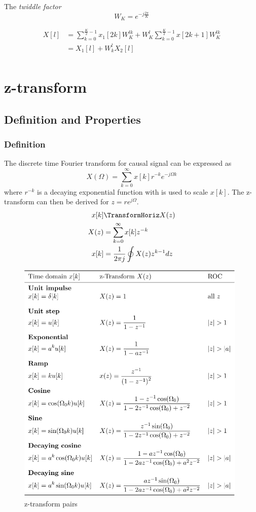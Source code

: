 The \textit{twiddle factor}
\begin{equation*}
    W_K = e^{-j\frac{2\pi}{K}}
\end{equation*}

\begin{align*}
    X[l] &= \sum_{k=0}^{\frac{K}{2}-1}x_1[2k]W_K^{lk} + W_K^{l} \sum_{k=0}^{\frac{K}{2}-1}x[2k+1]W_K^{lk}  \\
    &= X_1[l] + W_k^l X_2[l] \\
\end{align*}


\newpage
\section{z-transform}
\subsection{Definition and Properties}
\subsubsection{Definition}
The discrete time Fourier transform for causal signal can be expressed as
\begin{equation*}
    X(\Omega) = \sum_{k=0}^{\infty}x[k]r^{-k}e^{-j\Omega k}
\end{equation*}
where $r^{-k}$ is a decaying exponential function with is used to scale $x[k]$.
The z-transform can then be derived for $z=re^{j\Omega}$.
\begin{align*}
    x[k] &\TransformHoriz X(z) \\
    X(z) &= \sum_{k=0}^{\infty} x[k]z^{-k} \\
    x[k] &= \frac{1}{2\pi j} \oint X(z)z^{k-1}dz \\
\end{align*}

\begin{figure}[!h]
    \centering
    \includegraphics[width=11cm]{image/z-transform_pairs.png}
    \caption{z-transform pairs}
    \label{fig:z-transform_pairs}
\end{figure}


